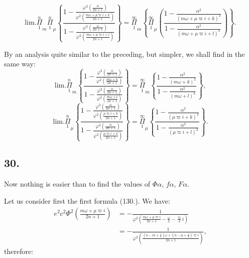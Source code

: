 \documentclass{article}
\begin{document}
\[ \text{lim.}\overset{n}{\underset{1}{\Pi}}_{m}\overset{n}{\underset{1}{\Pi}}_{\mu}\left\{\frac{1-\frac{\varphi^{2}\left(\frac{\alpha}{2n+1}\right)}{\varphi^{2}\left(\frac{m\omega+\mu\varpi i+k}{2n+1}\right)}}{1-\frac{\varphi^{2}\left(\frac{\alpha}{2n+1}\right)}{\varphi^{2}\left(\frac{m\omega+\mu\varpi i+l}{2n+1}\right)}}\right\}=\overset{\infty}{\underset{1}{\Pi}}_{m}\left\{\overset{\infty}{\underset{1}{\Pi}}_{\mu}\left(\frac{1-\frac{\alpha^{2}}{(m\omega+\mu\varpi i+k)^{2}}}{1-\frac{\alpha^{2}}{(m\omega+\mu\varpi i+l)^{2}}}\right)\right\}. \tag{172.} \]

By an analysis quite similar to the preceding, but simpler, we shall find in the same way:
\[ \text{lim.}\overset{n}{\underset{1}{\Pi}}_{m}\left\{\frac{1-\frac{\varphi^{2}\left(\frac{\alpha}{2n+1}\right)}{\varphi^{2}\left(\frac{m\omega+k}{2n+1}\right)}}{1-\frac{\varphi^{2}\left(\frac{\alpha}{2n+1}\right)}{\varphi^{2}\left(\frac{m\omega+l}{2n+1}\right)}}\right\}=\overset{\infty}{\underset{1}{\Pi}}_{m}\left\{\frac{1-\frac{\alpha^{2}}{(m\omega+k)^{2}}}{1-\frac{\alpha^{2}}{(m\omega+l)^{2}}}\right\}, \tag{173.} \]
\[ \text{lim.}\overset{n}{\underset{1}{\Pi}}_{\mu}\left\{\frac{1-\frac{\varphi^{2}\left(\frac{\alpha}{2n+1}\right)}{\varphi^{2}\left(\frac{\mu\varpi i+k}{2n+1}\right)}}{1-\frac{\varphi^{2}\left(\frac{\alpha}{2n+1}\right)}{\varphi^{2}\left(\frac{\mu\varpi i+k}{2n+1}\right)}}\right\}=\overset{\infty}{\underset{1}{\Pi}}_{\mu}\left\{\frac{1-\frac{\alpha^{2}}{(\mu\varpi i+k)^{2}}}{1-\frac{\alpha^{2}}{(\mu\varpi i+l)^{2}}}\right\}. \tag{174.} \]

\subsection*{30.}

Now nothing is easier than to find the values of $\Phi\alpha$, $f\alpha$, $F\alpha$.

Let us consider first the first formula (130.). We have:
\[ \begin{aligned}e^{2}c^{2}\Phi^{2}\left(\frac{m\omega+\mu\varpi i}{2n+1}\right)&=-\frac{1}{\varphi^{2}\left(\frac{m\omega+\mu\varpi i}{2n+1}-\frac{\omega}{2}-\frac{\varpi}{2}i\right)}\\ &=-\frac{1}{\varphi^{2}\left(\frac{(n-m+\tfrac{1}{2})\omega+(n-\mu+\tfrac{1}{2})\varpi i}{2n+1}\right)},\end{aligned} \]
therefore:
\end{document}
